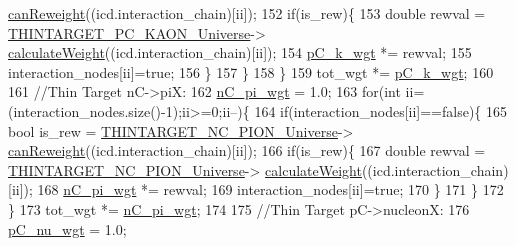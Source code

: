 \begin{DoxyCode}
      \hyperlink{class_neutrino_flux_reweight_1_1_thin_targetp_c_kaon_reweighter_a78d9307c378b36d660feb54ba8114a9a}{canReweight}((icd.interaction\_chain)[ii]);
152         \textcolor{keywordflow}{if}(is\_rew)\{
153           \textcolor{keywordtype}{double} rewval = \hyperlink{class_neutrino_flux_reweight_1_1_reweight_driver_aacd236a73fd4e708a0e90a1ca9edcb76}{THINTARGET\_PC\_KAON\_Universe}->
      \hyperlink{class_neutrino_flux_reweight_1_1_thin_targetp_c_kaon_reweighter_a64f5f6df3b44240b56b863206773ca9a}{calculateWeight}((icd.interaction\_chain)[ii]);
154           \hyperlink{class_neutrino_flux_reweight_1_1_reweight_driver_a082aaa736863e7bdfc8a057fcc78164c}{pC\_k\_wgt} *= rewval;
155           interaction\_nodes[ii]=\textcolor{keyword}{true};
156         \}
157       \}
158     \}
159     tot\_wgt *= \hyperlink{class_neutrino_flux_reweight_1_1_reweight_driver_a082aaa736863e7bdfc8a057fcc78164c}{pC\_k\_wgt};
160     
161     \textcolor{comment}{//Thin Target nC->piX:}
162     \hyperlink{class_neutrino_flux_reweight_1_1_reweight_driver_aaf002e71ebfbd7651b0e2c6d2aa11f43}{nC\_pi\_wgt} = 1.0;
163     \textcolor{keywordflow}{for}(\textcolor{keywordtype}{int} ii=(interaction\_nodes.size()-1);ii>=0;ii--)\{        
164       \textcolor{keywordflow}{if}(interaction\_nodes[ii]==\textcolor{keyword}{false})\{
165         \textcolor{keywordtype}{bool} is\_rew = \hyperlink{class_neutrino_flux_reweight_1_1_reweight_driver_aaa94d62c4e0a72f462df4b09399593f9}{THINTARGET\_NC\_PION\_Universe}->
      \hyperlink{class_neutrino_flux_reweight_1_1_thin_targetn_c_pion_reweighter_aaeb028c4bd75fcbbae6e03aba3a7e85a}{canReweight}((icd.interaction\_chain)[ii]);
166         \textcolor{keywordflow}{if}(is\_rew)\{
167           \textcolor{keywordtype}{double} rewval = \hyperlink{class_neutrino_flux_reweight_1_1_reweight_driver_aaa94d62c4e0a72f462df4b09399593f9}{THINTARGET\_NC\_PION\_Universe}->
      \hyperlink{class_neutrino_flux_reweight_1_1_thin_targetn_c_pion_reweighter_abe918e387700a09d5878cfd22dddfdd8}{calculateWeight}((icd.interaction\_chain)[ii]);
168           \hyperlink{class_neutrino_flux_reweight_1_1_reweight_driver_aaf002e71ebfbd7651b0e2c6d2aa11f43}{nC\_pi\_wgt} *= rewval;
169           interaction\_nodes[ii]=\textcolor{keyword}{true};
170         \}
171       \}
172     \}
173     tot\_wgt *= \hyperlink{class_neutrino_flux_reweight_1_1_reweight_driver_aaf002e71ebfbd7651b0e2c6d2aa11f43}{nC\_pi\_wgt};
174     
175     \textcolor{comment}{//Thin Target pC->nucleonX:}
176     \hyperlink{class_neutrino_flux_reweight_1_1_reweight_driver_a96bc68526c4939c0018aa41d94c3a106}{pC\_nu\_wgt} = 1.0;

\end{DoxyCode}
